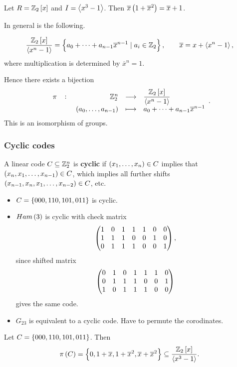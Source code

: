 \begin{example*}
Let $ R = \Z_2\sbr{x} $ and $ I = \left\langle x^3 - 1 \right\rangle $. Then $ \overline{x}\br{1 + \overline{x}^2} = \overline{x} + 1 $.
\end{example*}

In general is the following.

\begin{proposition}
$$ \dfrac{\Z_2\sbr{x}}{\abr{x^n - 1}} = \cbr{a_0 + \dots + a_{n - 1}\overline{x}^{n - 1} \mid a_i \in \Z_2}, \qquad \overline{x} = x + \abr{x^n - 1}, $$
where multiplication is determined by $ \overline{x}^n = 1 $.
\end{proposition}

Hence there exists a bijection
$$ \function[\pi]{\Z_2^n}{\dfrac{\Z_2\sbr{x}}{\abr{x^n - 1}}}{\br{a_0, \dots, a_{n - 1}}}{a_0 + \dots + a_{n - 1}\overline{x}^{n - 1}}. $$
This is an isomorphism of groups.

\pagebreak

\subsubsection{Cyclic codes}

\begin{definition*}
A linear code $ C \subseteq \mathbb{Z}_2^n $ is \textbf{cyclic} if $ \br{x_1, \dots, x_n} \in C $ implies that $ \br{x_n, x_1, \dots, x_{n - 1}} \in C $, which implies all further shifts $ \br{x_{n - 1}, x_n, x_1, \dots, x_{n - 2}} \in C $, etc.
\end{definition*}

\begin{example*}
\hfill
\begin{itemize}
\item $ C = \cbr{000, 110, 101, 011} $ is cyclic.
\item $ Ham\br{3} $ is cyclic with check matrix
$$ \begin{pmatrix} 1 & 0 & 1 & 1 & 1 & 0 & 0 \\ 1 & 1 & 1 & 0 & 0 & 1 & 0 \\ 0 & 1 & 1 & 1 & 0 & 0 & 1 \end{pmatrix}, $$
since shifted matrix
$$ \begin{pmatrix} 0 & 1 & 0 & 1 & 1 & 1 & 0 \\ 0 & 1 & 1 & 1 & 0 & 0 & 1 \\ 1 & 0 & 1 & 1 & 1 & 0 & 0 \end{pmatrix} $$
gives the same code.
\item $ G_{23} $ is equivalent to a cyclic code. Have to permute the corodinates.
\end{itemize}
\end{example*}

\begin{example*}
Let $ C = \cbr{000, 110, 101, 011} $. Then
$$ \pi\br{C} = \cbr{0, 1 + \overline{x}, 1 + \overline{x}^2, \overline{x} + \overline{x}^2} \subseteq \dfrac{\Z_2\sbr{x}}{\abr{x^3 - 1}}. $$
\end{example*}

